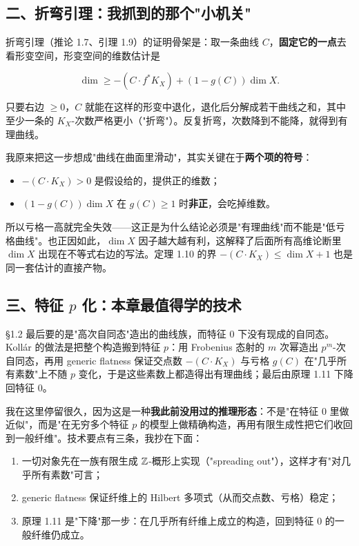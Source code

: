 \subsection*{二、折弯引理：我抓到的那个"小机关"}

折弯引理（推论 1.7、引理 1.9）的证明骨架是：取一条曲线 $C$，\textbf{固定它的一点}去看形变空间，形变空间的维数估计是

\[
\dim \ge -(C\cdot f^*K_X)+(1-g(C))\dim X .
\]

只要右边 $\ge 0$，$C$ 就能在这样的形变中退化，退化后分解成若干曲线之和，其中至少一条的 $K_X$-次数严格更小（"折弯"）。反复折弯，次数降到不能降，就得到有理曲线。

我原来把这一步想成"曲线在曲面里滑动"，其实关键在于\textbf{两个项的符号}：

\begin{itemize}
\item $-(C\cdot K_X)>0$ 是假设给的，提供正的维数；
\item $(1-g(C))\dim X$ 在 $g(C)\ge1$ 时\textbf{非正}，会吃掉维数。
\end{itemize}

所以亏格一高就完全失效——这正是为什么结论必须是"有理曲线"而不能是"低亏格曲线"。也正因如此，$\dim X$ 因子越大越有利，这解释了后面所有高维论断里 $\dim X$ 出现在不等式右边的写法。定理 1.10 的界 $-(C\cdot K_X)\le\dim X+1$ 也是同一套估计的直接产物。

\subsection*{三、特征 $p$ 化：本章最值得学的技术}

\S1.2 最后要的是"高次自同态"造出的曲线族，而特征 $0$ 下没有现成的自同态。Kollár 的做法是把整个构造搬到特征 $p$：用 Frobenius 态射的 $m$ 次幂造出 $p^m$-次自同态，再用 generic flatness 保证交点数 $-(C\cdot K_X)$ 与亏格 $g(C)$ 在"几乎所有素数"上不随 $p$ 变化，于是这些素数上都造得出有理曲线；最后由原理 1.11 下降回特征 $0$。

我在这里停留很久，因为这是一种\textbf{我此前没用过的推理形态}：不是"在特征 $0$ 里做近似"，而是"在无穷多个特征 $p$ 的模型上做精确构造，再用有限生成性把它们收回到一般纤维"。技术要点有三条，我抄在下面：

\begin{enumerate}
\item 一切对象先在一族有限生成 $\mathbb{Z}$-概形上实现（"spreading out"），这样才有"对几乎所有素数"可言；
\item generic flatness 保证纤维上的 Hilbert 多项式（从而交点数、亏格）稳定；
\item 原理 1.11 是"下降"那一步：在几乎所有纤维上成立的构造，回到特征 $0$ 的一般纤维仍成立。
\end{enumerate}

